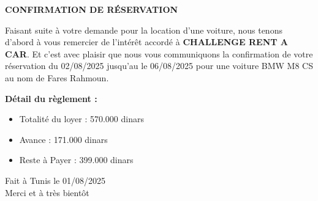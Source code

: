\documentclass[a4paper,12pt]{article}
\begin{document}
\begin{center}
  \textbf{\large CONFIRMATION DE RÉSERVATION}
\end{center}

\vspace{2cm}

\begin{flushleft}
  \normalsize
  Faisant suite à votre demande pour la location d'une voiture, nous tenons d'abord à vous remercier de l’intérêt accordé à \textbf{CHALLENGE RENT A CAR}. Et c’est avec plaisir que nous vous communiquons la confirmation de votre réservation du 02/08/2025 jusqu’au le 06/08/2025 pour une voiture BMW M8 CS au nom de ‪Fares Rahmoun‬‏.
\end{flushleft}

\vspace{4cm}

\begin{flushright}
  \begin{minipage}{0.5\textwidth}
    \textbf{Détail du règlement :}
    \vspace{0.5cm}
    \begin{itemize}
      \item Totalité du loyer : 570.000 dinars
      \item Avance : 171.000 dinars
      \item Reste à Payer : 399.000 dinars
    \end{itemize}
    \vspace{1cm}
    Fait à Tunis le 01/08/2025\\
    Merci et à très bientôt
  \end{minipage}
\end{flushright}

\vspace{2cm}

\end{document}
